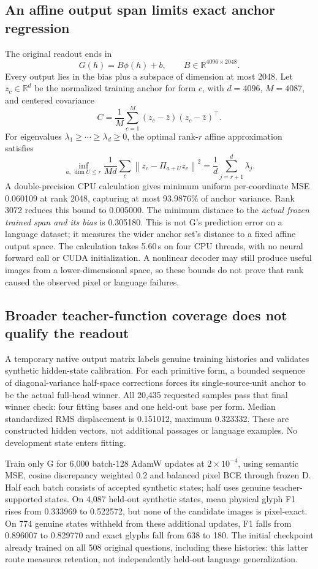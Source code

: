 \subsection*{An affine output span limits exact anchor regression}
The original readout ends in
\[
G(h)=B\phi(h)+b,\qquad B\in\mathbb{R}^{4096\times2048}.
\]
Every output lies in the bias plus a subspace of dimension at most 2048.
Let $z_c\in\mathbb{R}^d$ be the normalized training anchor for form $c$,
with $d=4096$, $M=4087$, and centered covariance
\[
C=\frac{1}{M}\sum_{c=1}^M(z_c-\bar z)(z_c-\bar z)^\top.
\]
For eigenvalues $\lambda_1\geq\cdots\geq\lambda_d\geq0$, the optimal
rank-$r$ affine approximation satisfies
\[
\inf_{a,\,\dim U\leq r}\frac{1}{Md}\sum_c
 \left\|z_c-\Pi_{a+U}z_c\right\|^2
 =\frac{1}{d}\sum_{j=r+1}^{d}\lambda_j.
\]
A double-precision CPU calculation gives minimum uniform per-coordinate
MSE 0.060109 at rank 2048, capturing at most 93.9876\% of anchor variance.
Rank 3072 reduces this bound to 0.005000. The minimum distance to the
\emph{actual frozen trained span and its bias} is 0.305180. This is not
G's prediction error on a language dataset; it measures the wider anchor
set's distance to a fixed affine output space. The calculation takes 5.60\,s
on four CPU threads, with no neural forward call or CUDA initialization.
A nonlinear decoder may still produce useful images from a lower-dimensional
space, so these bounds do not prove that rank caused the observed pixel or
language failures.

\subsection*{Broader teacher-function coverage does not qualify the readout}
A temporary native output matrix labels genuine training histories and
validates synthetic hidden-state calibration. For each primitive form, a
bounded sequence of diagonal-variance half-space corrections forces its
single-source-unit anchor to be the actual full-head winner. All 20,435
requested samples pass that final winner check: four fitting bases and one
held-out base per form. Median standardized RMS displacement is 0.151012,
maximum 0.323332. These are constructed hidden vectors, not additional
passages or language examples. No development state enters fitting.

Train only G for 6,000 batch-128 AdamW updates at $2\times10^{-4}$, using
semantic MSE, cosine discrepancy weighted 0.2 and balanced pixel BCE through
frozen D. Half each batch consists of accepted synthetic states; half uses
genuine teacher-supported states. On 4,087 held-out synthetic states,
mean physical glyph F1 rises from 0.333969 to 0.522572, but none of the
candidate images is pixel-exact. On 774 genuine states withheld from these
additional updates, F1 falls from 0.896007 to 0.829770 and exact glyphs fall
from 638 to 180. The initial checkpoint already trained on all 508 original
questions, including these histories: this latter route measures retention,
not independently held-out language generalization.

